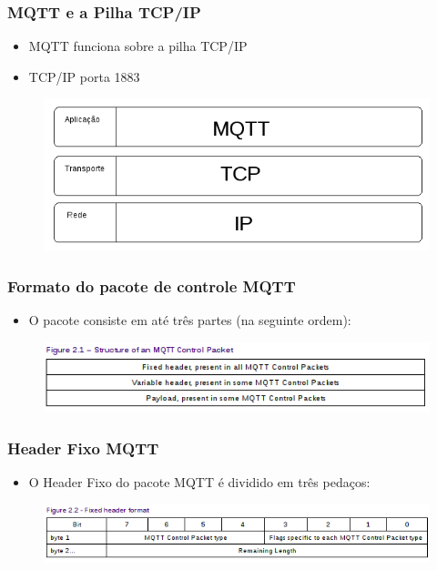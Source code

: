 \documentclass{beamer}
\begin{document}
\begin{frame}
\frametitle{MQTT e a Pilha TCP/IP}
\begin{itemize}
\item MQTT funciona sobre a pilha TCP/IP
\item TCP/IP porta 1883
\end{itemize}
\begin{figure}
\centering
\includegraphics[scale=0.5]{MQTT2}
\end{figure}
\end{frame}


\begin{frame}
\frametitle{Formato do pacote de controle MQTT}
\begin{itemize}
\item O pacote consiste em at\'{e} tr\^{e}s partes (na seguinte ordem):
\end{itemize}
\begin{figure}
\centering
\includegraphics[scale=0.7]{MQTT-Formato-PKT}
\end{figure}
\end{frame}


\begin{frame}
\frametitle{Header Fixo MQTT}
\begin{itemize}
\item O Header Fixo do pacote MQTT \'{e} dividido em tr\^{e}s peda\c{c}os:
\end{itemize}
\begin{figure}
\centering
\includegraphics[scale=0.6]{MQTT-FixedHeader-Format}
\end{figure}
\end{frame}
\end{document}
